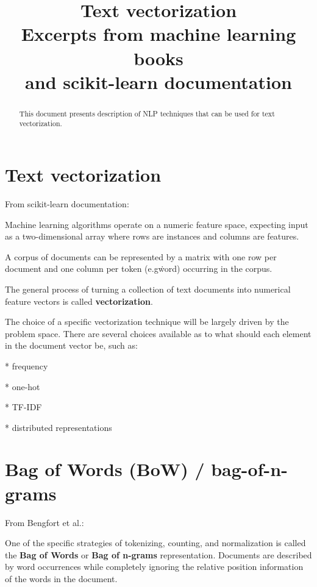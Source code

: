 \documentclass[11pt]{article}
\begin{document}
    \title{Text vectorization \\
    Excerpts from machine learning books \\
    and scikit-learn documentation}

    \maketitle

    \begin{abstract}
        This document presents description of NLP techniques that can be used for text vectorization.
    \end{abstract}

    \section{Text vectorization} \label{sec:text_vectorization}

    From scikit-learn documentation\cite{Scikit-learndevelopers2019}:

    Machine learning algorithms operate on a numeric feature space, expecting input as a two-dimensional array where rows are instances and columns are features.

    A corpus of documents can be represented by a matrix with one row per document and one column per token (e.g\. word) occurring in the corpus.

    The general process of turning a collection of text documents into numerical feature vectors is called \textbf{vectorization}.

    The choice of a specific vectorization technique will be largely driven by the problem space.
    There are several choices available as to what should each element in the document vector be, such as:

    * frequency

    * one-hot

    * TF-IDF

    * distributed representations

    \section{Bag of Words (BoW) / bag-of-n-grams} \label{sec:bag_of_words}

    From Bengfort et al.\cite{Bengfort2018}:

    One of the specific strategies of tokenizing, counting, and normalization is called the \textbf{Bag of Words} or \textbf{Bag of n-grams} representation.
    Documents are described by word occurrences while completely ignoring the relative position information of the words in the document.
\end{document}
